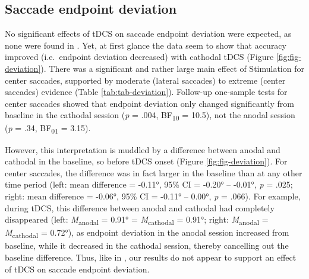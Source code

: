 \documentclass[11pt,]{memoir}
\begin{document}
\hypertarget{saccade-endpoint-deviation}{%
\subsection{Saccade endpoint deviation}\label{saccade-endpoint-deviation}}

No significant effects of tDCS on saccade endpoint deviation were expected, as none were found in \textcite{Kanai2012}. Yet, at first glance the data seem to show that accuracy improved (i.e.~endpoint deviation decreased) with cathodal tDCS (Figure \ref{fig:fig-deviation}). There was a significant and rather large main effect of Stimulation for center saccades, supported by moderate (lateral saccades) to extreme (center saccades) evidence (Table \ref{tab:tab-deviation}). Follow-up one-sample tests for center saccades showed that endpoint deviation only changed significantly from baseline in the cathodal session (\emph{p} = .004, BF\textsubscript{10} = 10.5), not the anodal session (\emph{p} = .34, BF\textsubscript{01} = 3.15).

However, this interpretation is muddled by a difference between anodal and cathodal in the baseline, so before tDCS onset (Figure \ref{fig:fig-deviation}). For center saccades, the difference was in fact larger in the baseline than at any other time period (left: mean difference = -0.11°, 95\% CI = -0.20° -- -0.01°, \emph{p} = .025; right: mean difference = -0.06°, 95\% CI = -0.11° -- 0.00°, \emph{p} = .066). For example, during tDCS, this difference between anodal and cathodal had completely disappeared (left: \emph{M}\textsubscript{anodal} = 0.91° = \emph{M}\textsubscript{cathodal} = 0.91°; right: \emph{M}\textsubscript{anodal} = \emph{M}\textsubscript{cathodal} = 0.72°), as endpoint deviation in the anodal session increased from baseline, while it decreased in the cathodal session, thereby cancelling out the baseline difference. Thus, like in \textcite{Kanai2012}, our results do not appear to support an effect of tDCS on saccade endpoint deviation.
\end{document}

